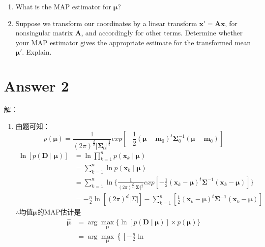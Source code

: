 \documentclass[a4paper,11pt,onecolumn,oneside,UTF8]{article}
\begin{document}
\begin{enumerate}
    \item What is the MAP estimator for $\bm\mu$?
    \item Suppose we transform our coordinates by a linear transform $\bm x' = \bm{Ax}$, for nonsingular
          matrix \textbf{A}, and accordingly for other terms. Determine whether your MAP estimator
          gives the appropriate estimate for the transformed mean $\bm\mu'$. Explain.
\end{enumerate}

\section*{Answer 2}
解：
\begin{enumerate}
    \item 由题可知：
          $$
              p\left(\bm\mu\right) = \frac{1}{\left(2\pi\right)^\frac{d}{2}|\bm\Sigma_0|^\frac{1}{2}}
              exp[-\frac{1}{2}\left(\bm\mu-\bm m_0\right)^t\bm\Sigma_0^{-1}\left(\bm\mu-\bm m_0\right)]
          $$
          $$
              \begin{aligned}
                  \ln\left[p\left(\bm D \mid \bm\mu\right)\right]
                   & = \ln \prod\limits_{k=1}^n p\left(\bm x_k \mid \bm \mu \right)                              \\
                   & = \sum\limits_{k=1}^n \ln p\left(\bm x_k \mid \bm \mu \right)                               \\
                   & = \sum\limits_{k=1}^n \ln \{ \frac{1}{\left(2\pi\right)^\frac{d}{2}|\bm\Sigma|^\frac{1}{2}}
                  exp[-\frac{1}{2}\left(\bm x_k-\bm\mu\right)^t\bm\Sigma^{-1}\left(\bm x_k-\bm \mu\right)] \}    \\
                   & = -\frac{n}{2}\ln\left[\left(2\pi\right)^d|\Sigma|\right]-\sum\limits_{k=1}^n \left[
                      \frac{1}{2}\left(\bm x_k-\bm\mu\right)^t\bm\Sigma^{-1}\left(\bm x_k-\bm \mu\right)\right]
              \end{aligned}
          $$
          $\therefore$均值$\bm\mu$的MAP估计是
          $$
              \begin{aligned}
                  \hat{\bm\mu} & = \mathop{arg} \mathop{max}\limits_{\bm\mu} \{\ln\left[p\left(\bm D
                  \mid \bm\mu\right)\right]\times p\left(\bm\mu\right)\}                                            \\
                               & = \mathop{arg} \mathop{max}\limits_{\bm\mu} \left\{\left[-\frac{n}{2}\ln

\end{aligned}$$
\end{enumerate}
\end{document}

